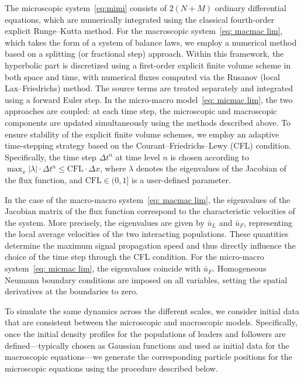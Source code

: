 \documentclass[10pt, reqno]{amsart}
\theoremstyle{definition}
\theoremstyle{remark}
\numberwithin{equation}{section}
\begin{document}
The microscopic system~\eqref{eq:mimi} consists of $2(N+M)$ ordinary differential equations, which are numerically integrated using the classical fourth-order explicit Runge–Kutta method. For the macroscopic system~\eqref{eq: macmac lim}, which takes the form of a system of balance laws, we employ a numerical method based on a splitting (or fractional step) approach. Within this framework, the hyperbolic part is discretized using a first-order explicit finite volume scheme in both space and time, with numerical fluxes computed via the Rusanov (local Lax--Friedrichs) method. The source terms are treated separately and integrated using a forward Euler step. In the micro-macro model~\eqref{eq: micmac lim}, the two approaches are coupled: at each time step, the microscopic and macroscopic components are updated simultaneously using the methods described above. To ensure stability of the explicit finite volume schemes, we employ an adaptive time-stepping strategy based on the Courant–Friedrichs–Lewy (CFL) condition. Specifically, the time step $\Delta t^n$ at time level $n$ is chosen according to $\max_x |\lambda|\cdot \Delta t^n \leq \mathrm{CFL} \cdot \Delta x$, where $\lambda$ denotes the eigenvalues of the Jacobian of the flux function, and $\mathrm{CFL} \in (0,1]$ is a user-defined parameter.

In the case of the macro-macro system~\eqref{eq: macmac lim}, the eigenvalues of the Jacobian matrix of the flux function correspond to the characteristic velocities of the system. More precisely, the eigenvalues are given by $\bar{u}_L$ and $\bar{u}_F$, representing the local average velocities of the two interacting populations. These quantities determine the maximum signal propagation speed and thus directly influence the choice of the time step through the CFL condition. For the micro-macro system~\eqref{eq: micmac lim}, the eigenvalues coincide with $\bar{u}_F$. Homogeneous Neumann boundary conditions are imposed on all variables, setting the spatial derivatives at the boundaries to zero.

To simulate the same dynamics across the different scales, we consider initial data that are consistent between the microscopic and macroscopic models. Specifically, once the initial density profiles for the populations of leaders and followers are defined—typically chosen as Gaussian functions and used as initial data for the macroscopic equations—we generate the corresponding particle positions for the microscopic equations using the procedure described below. 
\end{document}
